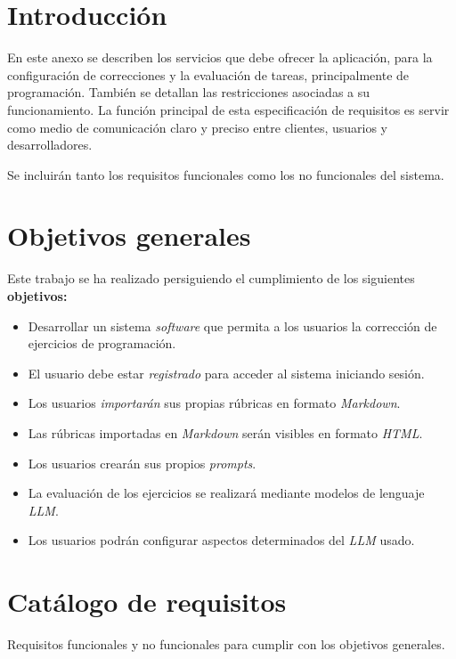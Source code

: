 
\section{Introducción}

En este anexo se describen los servicios que debe ofrecer la aplicación, para la configuración de correcciones y la evaluación de tareas, principalmente de programación. También se detallan las restricciones asociadas a su funcionamiento. La función principal de esta especificación de requisitos es servir como medio de comunicación claro y preciso entre clientes, usuarios y desarrolladores.

Se incluirán tanto los requisitos funcionales como los no funcionales del sistema.

\section{Objetivos generales}

Este trabajo se ha realizado persiguiendo el cumplimiento de los siguientes \textbf{objetivos:}

\begin{itemize}
    \item Desarrollar un sistema \textit{software} que permita a los usuarios la corrección de ejercicios de programación.
    \item El usuario debe estar \textit{registrado} para acceder al sistema iniciando sesión.
    \item Los usuarios \textit{importarán} sus propias rúbricas en formato \textit{Markdown}.
    \item Las rúbricas importadas en \textit{Markdown} serán visibles en formato \textit{HTML}.
    \item Los usuarios crearán sus propios \textit{prompts}.
    \item La evaluación de los ejercicios se realizará mediante modelos de lenguaje \textit{LLM}.
    \item Los usuarios podrán configurar aspectos determinados del \textit{LLM} usado.
\end{itemize}

\section{Catálogo de requisitos}
Requisitos funcionales y no funcionales para cumplir con los objetivos generales.

